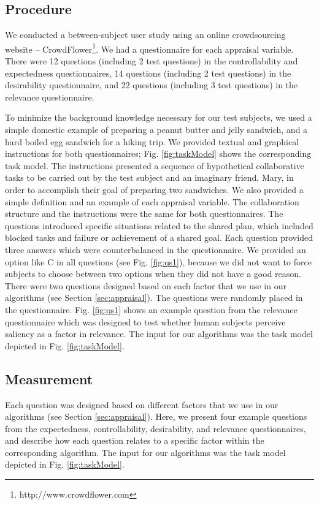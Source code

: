 \documentclass[12pt]{report}
\begin{document}
\subsection{Procedure}
 We conducted a between-subject user study using an online crowdsourcing website
 -- CrowdFlower\footnote{http://www.crowdflower.com}. We had a questionnaire for
 each appraisal variable. There were 12 questions (including 2 test questions)
 in the controllability and expectedness questionnaires, 14 questions (including
 2 test questions) in the desirability questionnaire, and 22 questions
 (including 3 test questions) in the relevance questionnaire.
 
To minimize the background knowledge necessary for our test subjects, we used a
simple domestic example of preparing a peanut butter and jelly sandwich, and a
hard boiled egg sandwich for a hiking trip. We provided textual and graphical
instructions for both questionnaires; Fig. \ref{fig:taskModel} shows the
corresponding task model. The instructions presented a sequence of hypothetical
collaborative tasks to be carried out by the test subject and an imaginary
friend, Mary, in order to accomplish their goal of preparing two sandwiches. We
also provided a simple definition and an example of each appraisal variable. The
collaboration structure and the instructions were the same for both
questionnaires. The questions introduced specific situations related to the
shared plan, which included blocked tasks and failure or achievement of a shared
goal. Each question provided three answers which were counterbalanced in the
questionnaire. We provided an option like C in all questions (see Fig.
\ref{fig:qs1}), because we did not want to force subjects to choose between two
options when they did not have a good reason. There were two questions designed
based on each factor that we use in our algorithms (see Section
\ref{sec:appraisal}). The questions were randomly placed in the questionnaire.
Fig. \ref{fig:qs1} shows an example question from the relevance questionnaire
which was designed to test whether human subjects perceive saliency as a factor
in relevance. The input for our algorithms was the task model depicted in Fig.
\ref{fig:taskModel}.

\subsection{Measurement}
Each question was designed based on different factors that we use in our
algorithms (see Section \ref{sec:appraisal}). Here, we present four example
questions from the expectedness, controllability, desirability, and relevance
questionnaires, and describe how each question relates to a specific factor
within the corresponding algorithm. The input for our algorithms was the task
model depicted in Fig. \ref{fig:taskModel}.
\end{document}
